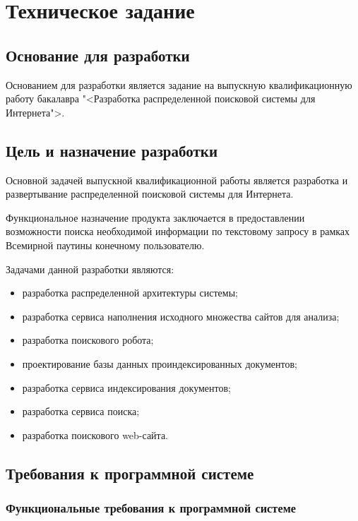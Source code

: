 \section{Техническое задание}
\subsection{Основание для разработки}

Основанием для разработки является задание на выпускную квалификационную работу бакалавра "<Разработка распределенной поисковой системы для Интернета">.

\subsection{Цель и назначение разработки}

Основной задачей выпускной квалификационной работы является разработка и развертывание распределенной поисковой системы для Интернета.

Функциональное назначение продукта заключается в предоставлении возможности поиска необходимой информации по текстовому запросу в рамках Всемирной паутины конечному пользователю.

Задачами данной разработки являются:
\begin{itemize}
\item разработка распределенной архитектуры системы;
\item разработка сервиса наполнения исходного множества сайтов для анализа;
\item разработка поискового робота;
\item проектирование базы данных проиндексированных документов;
\item разработка сервиса индексирования документов;
\item разработка сервиса поиска;
\item разработка поискового web-сайта.
\end{itemize}

\subsection{Требования к программной системе}

\subsubsection{Функциональные требования к программной системе}

